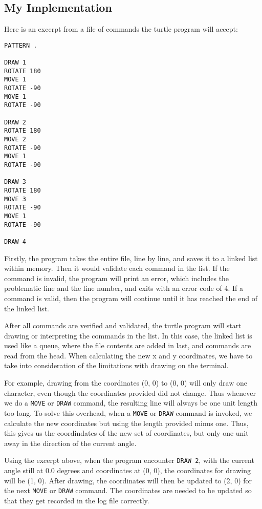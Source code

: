 \documentclass[a4paper, 12pt, titlepage]{article}
\newcommand{\code}[1]{\small\texttt{#1}\normalsize}
\begin{document}
\subsection{My Implementation}

Here is an excerpt from a file of commands the turtle program will accept:

\begin{lstlisting}
PATTERN .

DRAW 1
ROTATE 180
MOVE 1
ROTATE -90
MOVE 1
ROTATE -90

DRAW 2
ROTATE 180
MOVE 2
ROTATE -90
MOVE 1
ROTATE -90

DRAW 3
ROTATE 180
MOVE 3
ROTATE -90
MOVE 1
ROTATE -90

DRAW 4
\end{lstlisting}

Firstly, the program takes the entire file, line by line, and saves it to 
a linked list within memory. Then it would validate each command in the list. 
If the command is invalid, the program will print an error, which includes 
the problematic line and the line number, and exits with an error code of 4. 
If a command is valid, then the program will continue until it has reached 
the end of the linked list.

After all commands are verified and validated, the turtle program will start 
drawing or interpreting the commands in the list. In this case, the linked 
list is used like a queue, where the file contents are added in last, and 
commands are read from the head. When calculating the new x and y coordinates, 
we have to take into consideration of the limitations with drawing on the 
terminal.

For example, drawing from the coordinates (0, 0) to (0, 0) will only draw 
one character, even though the coordinates provided did not change. 
Thus whenever we do a \code{MOVE} or \code{DRAW} command, the resulting 
line will always be one unit length too long. To solve this overhead, 
when a \code{MOVE} or \code{DRAW} command is invoked, we calculate the 
new coordinates but using the length provided minus one. Thus, this gives 
us the coordindates of the new set of coordinates, but only one unit away 
in the direction of the current angle.

Using the excerpt above, when the program encounter \code{DRAW 2}, 
with the current angle still at 0.0 degrees and coordinates at (0, 0), 
the coordinates for drawing will be (1, 0). After drawing, the coordinates 
will then be updated to (2, 0) for the next \code{MOVE} or \code{DRAW} 
command. The coordinates are needed to be updated so that they get recorded 
in the log file correctly.
\end{document}
